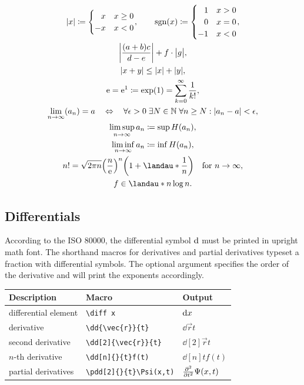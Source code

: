 \documentclass[DIV=13]{scrartcl}
\begin{document}
\begin{gather}
  \abs{x}\coloneq\begin{cases}
    \phantom{-}x & x\geq 0 \\
    -x           & x<0
  \end{cases}, \qquad
  \sgn(x)\coloneq\begin{cases}
    \phantom{-}1 & x>0 \\
    \phantom{-}0 & x=0 \\
    -1           & x<0
  \end{cases}, \\
  \abs*{\frac{(a+b)c}{d-e}} + f\cdot\abs[\big]{g}, \\
  \abs{x+y} \leq \abs{x}+\abs{y}, \\
  \e = \e^1 \coloneq \exp(1) = \sum_{k=0}^\infty \frac{1}{k!},\\
  \lim_{n\to\infty}(a_n) = a \quad\lequiv\quad
  \forall\epsilon>0\;\exists N\in\Nnums\;\forall n\geq N:
  \abs{a_n-a}<\epsilon,\\
  \limsup_{n\to\infty} a_n \coloneq \sup H(a_n), \\
  \liminf_{n\to\infty} a_n \coloneq \inf H(a_n), \\
  n! = \sqrt{2\pi n}\left(\frac{n}{\e}\right)^n
  \left(1+\landau*{\frac{1}{n}}\right) \quad\text{for } n\to\infty, \\
  f\in\landau*{n\log n}.
\end{gather}


\subsection{Differentials}
According to the ISO \num{80000}, the differential symbol $\mathop{}\!\mathrm{d}$ must be
printed in upright math font. The shorthand macros for derivatives and
partial derivatives typeset a fraction with differential symbols.
The optional argument specifies the order of the derivative and will print
the exponents accordingly.
\begin{center}
  \renewcommand{\arraystretch}{1.25}
  \begin{tabular}{lll}
    \toprule
    \textbf{Description} & \textbf{Macro}            & \textbf{Output}      \\
    \midrule
    differential element & \verb|\diff x|            & $\mathop{}\!\mathrm{d} x$            \\
    derivative           & \verb|\dd{\vec{r}}{t}|    & $\dd{\vec{r}}{t}$    \\
    second derivative    & \verb|\dd[2]{\vec{r}}{t}| & $\dd[2]{\vec{r}}{t}$ \\
    $n$-th derivative    & \verb|\dd[n]{}{t}f(t)|    & $\dd[n]{}{t}f(t)$    \\
    \midrule
    partial derivatives  & \verb|\pdd[2]{}{t}\Psi(x,t)|
                         & $\pdd[2]{}{t}\Psi(x,t)$                          \\
    \bottomrule
  \end{tabular}
\end{center}
\end{document}
